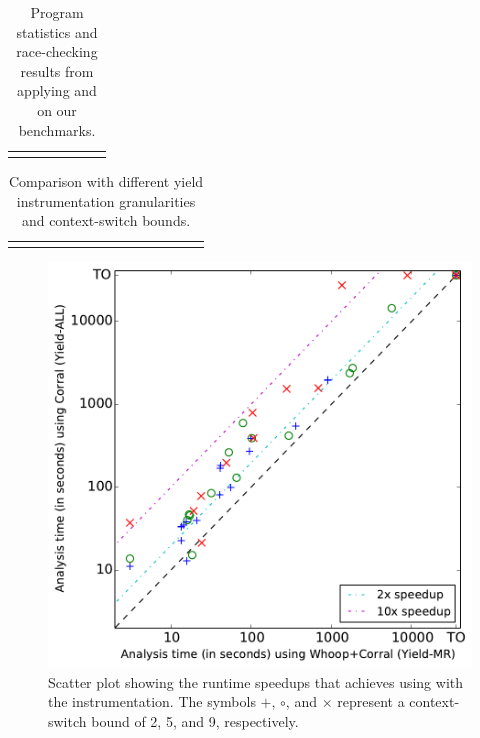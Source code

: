 \newcommand{\colspacing}{\hspace{1.8em}}
\begin{table}[t]
\small
\centering
\setlength{\tabcolsep}{0.3em}
\caption{Program statistics and race-checking results from applying \whoop and \corral on our benchmarks.}
\label{tab:stats}
\begin{tabular}{l rrr rr r}
\centering

\end{tabular}
\end{table}

\begin{table}[t]
\small
\centering
\setlength{\tabcolsep}{0.4em}
\caption{Comparison with different yield instrumentation granularities and context-switch bounds.}
\label{tab:results}
\begin{tabular}{l r rrrr rrrr rrrr}
\centering

\end{tabular}
\end{table}

\begin{figure}
\centering
\includegraphics[width=.99\linewidth]{experiments/figures/yieldmr_vs_yieldall.pdf}
\caption{Scatter plot showing the runtime speedups that \corral achieves using \whoop with the \yieldmr instrumentation. The symbols $+$, $\circ$, and $\times$ represent a context-switch bound of 2, 5, and 9, respectively.}
\label{fig:plot}
\end{figure}

